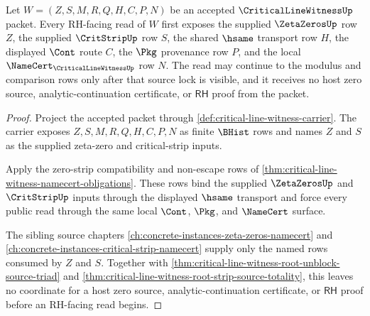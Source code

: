 \begin{theorem}
\label{thm:critical-line-witness-rh-source-lock}
Let $W=(Z,S,M,R,Q,H,C,P,N)$ be an accepted $\CriticalLineWitnessUp$ packet.
Every RH-facing read of $W$ first exposes the supplied $\ZetaZerosUp$ row
$Z$, the supplied $\CritStripUp$ row $S$, the shared $\hsame$ transport row
$H$, the displayed $\Cont$ route $C$, the $\Pkg$ provenance row $P$, and the
local $\NameCert_{\CriticalLineWitnessUp}$ row $N$. The read may continue to
the modulus and comparison rows only after that source lock is visible, and
it receives no host zero source, analytic-continuation certificate, or
$\mathsf{RH}$ proof from the packet.
\end{theorem}
\begin{proof}
Project the accepted packet through
\autoref{def:critical-line-witness-carrier}. The carrier exposes
$Z,S,M,R,Q,H,C,P,N$ as finite $\BHist$ rows and names $Z$ and $S$ as the
supplied zeta-zero and critical-strip inputs.

Apply the zero-strip compatibility and non-escape rows of
\autoref{thm:critical-line-witness-namecert-obligations}. These rows bind the
supplied $\ZetaZerosUp$ and $\CritStripUp$ inputs through the displayed
$\hsame$ transport and force every public read through the same local
$\Cont$, $\Pkg$, and $\NameCert$ surface.

The sibling source chapters
\autoref{ch:concrete-instances-zeta-zeros-namecert} and
\autoref{ch:concrete-instances-critical-strip-namecert} supply only the named
rows consumed by $Z$ and $S$. Together with
\autoref{thm:critical-line-witness-root-unblock-source-triad} and
\autoref{thm:critical-line-witness-root-strip-source-totality}, this leaves
no coordinate for a host zero source, analytic-continuation certificate, or
$\mathsf{RH}$ proof before an RH-facing read begins.
\end{proof}

